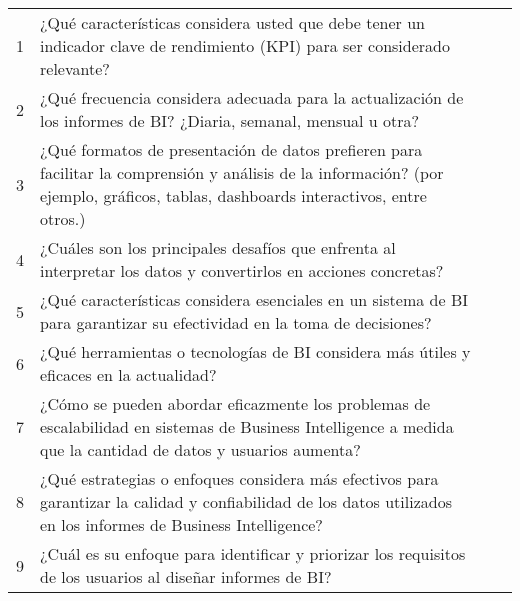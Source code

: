 \begin{longtable}{|l|p{5.9cm}|p{4cm}|p{4cm}|}
    1                                        & ¿Qué características considera usted que debe tener un indicador clave de rendimiento (KPI) para ser considerado relevante?                                                         &                                         &                                           \\
    2                                        & ¿Qué frecuencia considera adecuada para la actualización de los informes de BI? ¿Diaria, semanal, mensual u otra?                                                                   &                                         &                                           \\
    3                                        & ¿Qué formatos de presentación de datos prefieren para facilitar la comprensión y análisis de la información? (por ejemplo, gráficos, tablas, dashboards interactivos, entre otros.) &                                         &                                           \\
    4                                        & ¿Cuáles son los principales desafíos que enfrenta al interpretar los datos y convertirlos en acciones concretas?                                                                    &                                         &                                           \\
    5                                        & ¿Qué características considera esenciales en un sistema de BI para garantizar su efectividad en la toma de decisiones?                                                              &                                         &                                           \\
    6                                        & ¿Qué herramientas o tecnologías de BI considera más útiles y eficaces en la actualidad?                                                                                             &                                         &                                           \\
    7                                        & ¿Cómo se pueden abordar eficazmente los problemas de escalabilidad en sistemas de Business Intelligence a medida que la cantidad de datos y usuarios aumenta?                       &                                         &                                           \\
    8                                        & ¿Qué estrategias o enfoques considera más efectivos para garantizar la calidad y confiabilidad de los datos utilizados en los informes de Business Intelligence?                    &                                         &                                           \\
    9                                        & ¿Cuál es su enfoque para identificar y priorizar los requisitos de los usuarios al diseñar informes de BI?                                                                          &                                         &                                           \\
\end{longtable}

